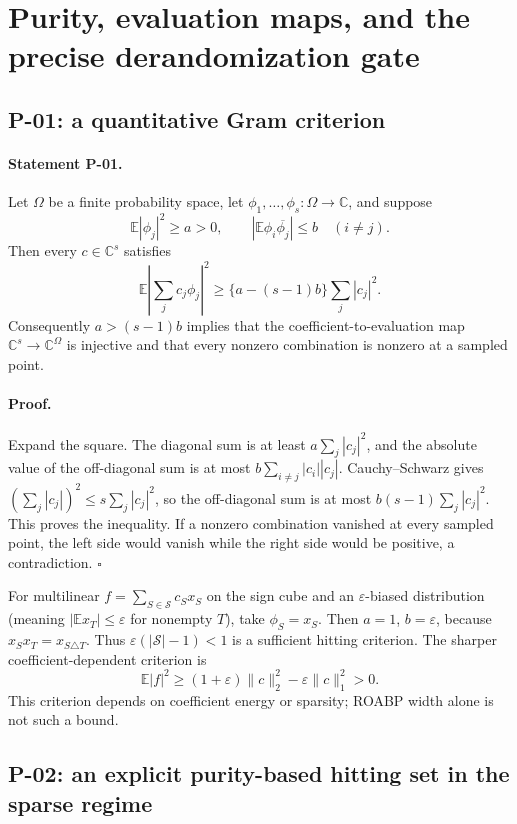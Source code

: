 \section{Purity, evaluation maps, and the precise derandomization gate}

\subsection{P-01: a quantitative Gram criterion}
\paragraph{Statement P-01.}
Let $\Omega$ be a finite probability space, let $\phi_1,\ldots,\phi_s:\Omega\to\mathbb C$, and suppose
\[
 \mathbb E|\phi_j|^2\ge a>0,\qquad
 |\mathbb E\phi_i\overline{\phi_j}|\le b\quad(i\ne j).
\]
Then every $c\in\mathbb C^s$ satisfies
\[
 \mathbb E\left|\sum_jc_j\phi_j\right|^2
 \ge \{a-(s-1)b\}\sum_j|c_j|^2.
\]
Consequently $a>(s-1)b$ implies that the coefficient-to-evaluation map $\mathbb C^s\to\mathbb C^\Omega$ is injective and that every nonzero combination is nonzero at a sampled point.
\paragraph{Proof.}
Expand the square. The diagonal sum is at least $a\sum_j|c_j|^2$, and the absolute value of the off-diagonal sum is at most $b\sum_{i\ne j}|c_i||c_j|$. Cauchy--Schwarz gives $(\sum_j|c_j|)^2\le s\sum_j|c_j|^2$, so the off-diagonal sum is at most $b(s-1)\sum_j|c_j|^2$. This proves the inequality. If a nonzero combination vanished at every sampled point, the left side would vanish while the right side would be positive, a contradiction. $\square$

For multilinear $f=\sum_{S\in\mathcal S}c_Sx_S$ on the sign cube and an $\varepsilon$-biased distribution (meaning $|\mathbb E x_T|\le\varepsilon$ for nonempty $T$), take $\phi_S=x_S$. Then $a=1$, $b=\varepsilon$, because $x_Sx_T=x_{S\triangle T}$. Thus $\varepsilon(|\mathcal S|-1)<1$ is a sufficient hitting criterion. The sharper coefficient-dependent criterion is
\[
 \mathbb E|f|^2\ge (1+\varepsilon)\|c\|_2^2-\varepsilon\|c\|_1^2>0.
\]
This criterion depends on coefficient energy or sparsity; ROABP width alone is not such a bound.

\subsection{P-02: an explicit purity-based hitting set in the sparse regime}
